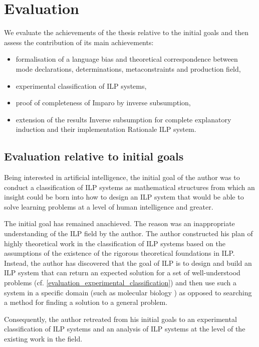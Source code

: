 \chapter{Evaluation}
We evaluate the achievements of the thesis relative to the initial goals and then assess the contribution of its main achievements:
\begin{itemize}
\item formalisation of a language bias and theoretical correspondence between mode declarations, determinations, metaconstraints and production field,
\item experimental classification of ILP systems,
\item proof of completeness of Imparo by inverse subsumption,
\item extension of the results Inverse subsumption for complete explanatory induction and their implementation Rationale ILP system.
\end{itemize}

\section{Evaluation relative to initial goals}
Being interested in artificial intelligence, the initial goal of the author was to conduct a classification of ILP systems as mathematical structures from which an insight could be born into how to design an ILP system that would be able to solve learning problems at a level of human intelligence and greater.

The initial goal has remained anachieved. The reason was an inappropriate understanding of the ILP field by the author. The author constructed his plan of highly theoretical work in the classification of ILP systems based on the assumptions of the existence of the rigorous theoretical foundations in ILP. Instead, the author has discovered that the goal of ILP is to design and build an ILP system that can return an expected solution for a set of well-understood problems (cf. \ref{evaluation_experimental_classification}) and then use such a system in a specific domain (such as molecular biology \cite{srinivasan1994mutagenesis}) as opposed to searching a method for finding a solution to a general problem.

Consequently, the author retreated from his initial goals to an experimental classification of ILP systems and an analysis of ILP systems at the level of the existing work \cite{nienhuys1997foundations}\cite{muggleton1995inverse}\cite{yamamoto2012inverse} in the field.


